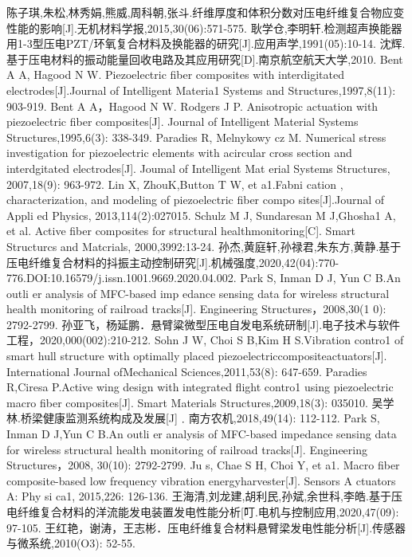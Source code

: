 \documentclass[lang=cn,11pt,a4paper,cite=authoryear]{elegantpaper}
\begin{document}
\begin{thebibliography}{99}  

  陈子琪,朱松,林秀娟,熊威,周科朝,张斗.纤维厚度和体积分数对压电纤维复合物应变性能的影响[J].无机材料学报,2015,30(06):571-575.
  耿学仓,李明轩.检测超声换能器用1-3型压电PZT/环氧复合材料及换能器的研究[J].应用声学,1991(05):10-14.
  沈辉. 基于压电材料的振动能量回收电路及其应用研究[D].南京航空航天大学,2010.
  Bent A A, Hagood N W. Piezoelectric fiber composites with interdigitated electrodes[J].Journal of Intelligent Materia1 Systems and Structures,1997,8(11): 903-919.
  Bent A A，Hagood N W. Rodgers J P. Anisotropic actuation with piezoelectric fiber composites[J]. Journal of Intelligent Material Systems Structures,1995,6(3): 338-349.
  Paradies R, Melnykowy cz M. Numerical stress investigation for piezoelectric elements with acircular cross section and interdgitated electrodes[J]. Joumal of Intelligent Mat erial Systems Structures, 2007,18(9): 963-972. 
  Lin X, ZhouK,Button T W, et a1.Fabni cation , characterization, and modeling of piezoelectric fiber compo sites[J].Journal of Appli ed Physics, 2013,114(2):027015.
  Schulz M J, Sundaresan M J,Ghosha1 A, et al. Active fiber composites for structural healthmonitoring[C]. Smart Structurcs and Matcrials, 2000,3992:13-24.
  孙杰,黄庭轩,孙禄君,朱东方,黄静.基于压电纤维复合材料的抖振主动控制研究[J].机械强度,2020,42(04):770-776.DOI:10.16579/j.issn.1001.9669.2020.04.002.
  Park S, Inman D J, Yun C B.An outli er analysis of MFC-based imp edance sensing data for wireless structural health monitoring of railroad tracks[J]. Engineering Structures，2008,30(1 0): 2792-2799.
  孙亚飞，杨延鹏．悬臂粱微型压电自发电系统研制[J].电子技术与软件工程，2020,000(002):210-212.
  Sohn J W, Choi S B,Kim H S.Vibration contro1 of smart hull structure with optimally placed piezoelectriccompositeactuators[J]. International Journal ofMechanical Sciences,2011,53(8): 647-659.
  Paradies R,Ciresa P.Active wing design with integrated flight contro1 using piezoelectric macro fiber composites[J]. Smart Materials Structures,2009,18(3): 035010.  
  吴学林.桥梁健康监测系统构成及发展[J]﹒南方农机,2018,49(14): 112-112.
  Park S, Inman D J,Yun C B.An outli er analysis of MFC-based impedance sensing data for wireless structural health monitoring of railroad tracks[J]. Engineering Structures，2008, 30(10): 2792-2799.  
  Ju s, Chae S H, Choi Y, et a1. Macro fiber composite-based low frequency vibration energyharvester[J]. Sensors A ctuators A: Phy si ca1, 2015,226: 126-136.
  王海清,刘龙建,胡利民,孙斌,余世科,李皓.基于压电纤维复合材料的洋流能发电装置发电性能分析[叮.电机与控制应用,2020,47(09): 97-105.
  王红艳，谢涛，王志彬．压电纤维复合材料悬臂梁发电性能分析[J].传感器与微系统,2010(O3): 52-55.

  
\end{thebibliography}
\end{document}
